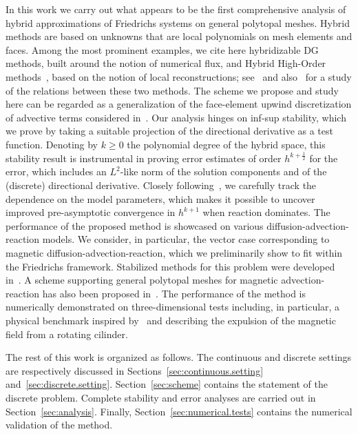 \documentclass[11pt,a4paper]{article}
\newcounter{corr}
\theoremstyle{plain}
\theoremstyle{remark}
\theoremstyle{definition}
\begin{document}
In this work we carry out what appears to be the first comprehensive analysis of hybrid approximations of Friedrichs systems on general polytopal meshes.
Hybrid methods are based on unknowns that are local polynomials on mesh elements and faces.
Among the most prominent examples, we cite here hybridizable DG~\cite{Cockburn.Gopalakrishnan.ea:09} methods, built around the notion of numerical flux, and Hybrid High-Order methods~\cite{Di-Pietro.Ern:15,Di-Pietro.Ern.ea:14}, based on the notion of local reconstructions; see~\cite{Cockburn.Di-Pietro.ea:16} and also~\cite[Section~5.1.6]{Di-Pietro.Droniou:20} for a study of the relations between these two methods.
The scheme we propose and study here can be regarded as a generalization of the face-element upwind discretization of advective terms considered in~\cite{Di-Pietro.Droniou.ea:15}.
Our analysis hinges on inf-sup stability, which we prove by taking a suitable projection of the directional derivative as a test function.
Denoting by $k \ge 0$ the polynomial degree of the hybrid space, this stability result is instrumental in proving error estimates of order $h^{k+\frac12}$ for the error, which includes an $L^2$-like norm of the solution components and of the (discrete) directional derivative.
Closely following~\cite{Ern.Guermond:21*2}, we carefully track the dependence on the model parameters, which makes it possible to uncover improved pre-asymptotic convergence in $h^{k+1}$ when reaction dominates.
The performance of the proposed method is showcased on various diffusion-advection-reaction models.
We consider, in particular, the vector case corresponding to magnetic diffusion-advection-reaction, which we preliminarily show to fit within the Friedrichs framework.
Stabilized methods for this problem were developed in~\cite{Wang.Wu:24,Wang.Wu:24*1,Luo.Wang.ea:26}.
A scheme supporting general polytopal meshes for magnetic advection-reaction has also been proposed in~\cite{Cantin.Ern:17}.
The performance of the method is numerically demonstrated on three-dimensional tests including, in particular, a physical benchmark inspired by~\cite{Perry.Jones:78} and describing the expulsion of the magnetic field from a rotating cilinder.
\smallskip

The rest of this work is organized as follows.
The continuous and discrete settings are respectively discussed in Sections~\ref{sec:continuous.setting} and~\ref{sec:discrete.setting}.
Section~\ref{sec:scheme} contains the statement of the discrete problem.
Complete stability and error analyses are carried out in Section~\ref{sec:analysis}.
Finally, Section~\ref{sec:numerical.tests} contains the numerical validation of the method.
\end{document}
